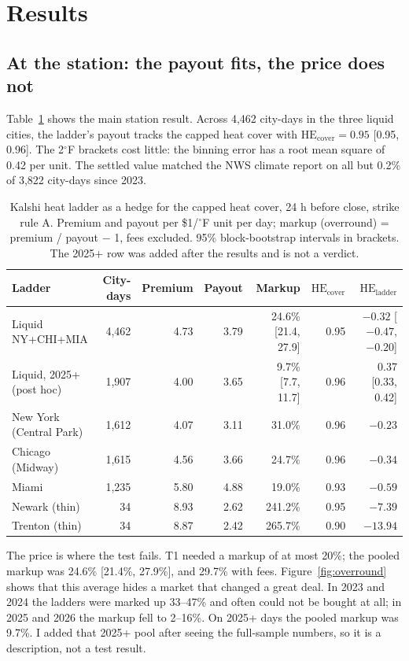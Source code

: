 \documentclass[11pt]{article}
\newcommand{\HEcov}{\mathrm{HE}_{\mathrm{cover}}}
\newcommand{\HElad}{\mathrm{HE}_{\mathrm{ladder}}}
\newcommand{\degF}{\ensuremath{^\circ}F}
\begin{document}
\section{Results}

\subsection{At the station: the payout fits, the price does not}
\label{sec:station}

Table~\ref{tab:station} shows the main station result. Across 4,462 city-days in the three liquid cities, the ladder's payout tracks the capped heat cover with $\HEcov = 0.95$ [0.95, 0.96]. The 2\degF{} brackets cost little: the binning error has a root mean square of 0.42 per unit. The settled value matched the NWS climate report on all but 0.2\% of 3,822 city-days since 2023.

\begin{table}[ht]
\centering
\small
\caption{Kalshi heat ladder as a hedge for the capped heat cover, 24 h before close, strike rule A. Premium and payout per \$1/\degF{} unit per day; markup (overround) = premium / payout $-$ 1, fees excluded. 95\% block-bootstrap intervals in brackets. The 2025+ row was added after the results and is not a verdict.}
\label{tab:station}
\footnotesize
\setlength{\tabcolsep}{4pt}
\begin{tabular}{lrrrrrr}
\toprule
Ladder & City-days & Premium & Payout & Markup & $\HEcov$ & $\HElad$ \\
\midrule
Liquid NY+CHI+MIA & 4,462 & 4.73 & 3.79 & 24.6\% [21.4, 27.9] & 0.95 & $-0.32$ [$-0.47$, $-0.20$] \\
Liquid, 2025+ (post hoc) & 1,907 & 4.00 & 3.65 & 9.7\% [7.7, 11.7] & 0.96 & 0.37 [0.33, 0.42] \\
New York (Central Park) & 1,612 & 4.07 & 3.11 & 31.0\% & 0.96 & $-0.23$ \\
Chicago (Midway) & 1,615 & 4.56 & 3.66 & 24.7\% & 0.96 & $-0.34$ \\
Miami & 1,235 & 5.80 & 4.88 & 19.0\% & 0.93 & $-0.59$ \\
Newark (thin) & 34 & 8.93 & 2.62 & 241.2\% & 0.95 & $-7.39$ \\
Trenton (thin) & 34 & 8.87 & 2.42 & 265.7\% & 0.90 & $-13.94$ \\
\bottomrule
\end{tabular}
\end{table}

The price is where the test fails. T1 needed a markup of at most 20\%; the pooled markup was 24.6\% [21.4\%, 27.9\%], and 29.7\% with fees. Figure~\ref{fig:overround} shows that this average hides a market that changed a great deal. In 2023 and 2024 the ladders were marked up 33--47\% and often could not be bought at all; in 2025 and 2026 the markup fell to 2--16\%. On 2025+ days the pooled markup was 9.7\%. I added that 2025+ pool after seeing the full-sample numbers, so it is a description, not a test result.
\end{document}
